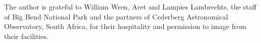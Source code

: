 \documentclass[preprint]{aastex}
\begin{document}








\acknowledgments
The author is grateful to William Wren, Aret and Lampies Lambrechts, the staff of Big Bend National Park and the partners of Cederberg Astronomical Observatory, South Africa, for their hospitality and permission to image from their facilities.


\end{document}
